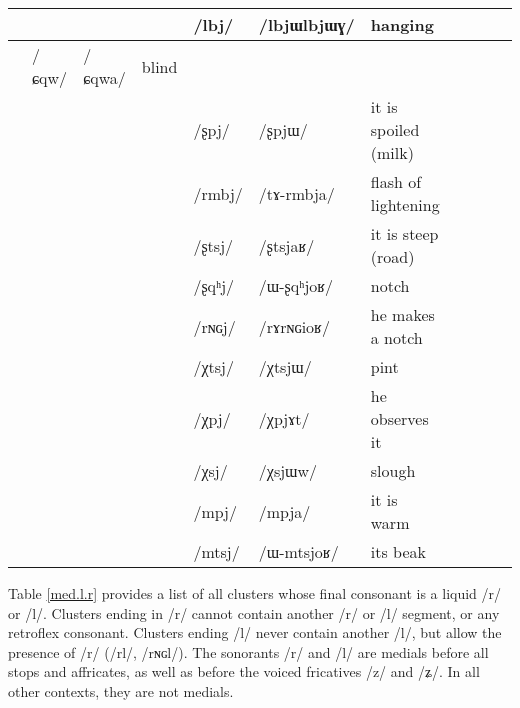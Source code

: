 \documentclass[oldfontcommands,oneside,a4paper,11pt]{article}
\newcommand{\ipa}[1]{/#1/} %
\newcommand{\trois}[1]{/#1/}
\newcommand{\tib}[1]{\cellcolor{lightgray}\textbf{#1}}
\newcommand{\idph}[1]{\cellcolor{gray}\textbf{#1}}
\begin{document}
\begin{table}
{\begin{tabular}{l|lll|lll|lll|l}
 		& 		&		&		&\trois{lbj} \idph{}		&\ipa{lbjɯlbjɯɣ} 		&hanging\\
\midrule												
		&\trois{ɕqw}		&\ipa{ɕqwa} 		&blind\\						
 		& 		&		&		&\trois{ʂpj} 		&\ipa{ʂpjɯ} 		&it is spoiled (milk)\\
 		& 		&		&		&\trois{rmbj} 		&\ipa{tɤ-rmbja} 		&flash of lightening\\
 		& 		&		&		&\trois{ʂtsj} 		&\ipa{ʂtsjaʁ} 		&it is steep (road)\\
 		& 		&		&		&\trois{ʂqʰj} 		&\ipa{ɯ-ʂqʰjoʁ} 		&notch\\
 		& 		&		&		&\trois{rɴɢj} 		&\ipa{rɤrɴɢioʁ} 		&he makes a notch\\
\midrule												
 		& 		&		&		&\trois{χtsj} 		&\ipa{χtsjɯ} 		&pint\\
 		& 		&		&		&\trois{χpj} \tib{}		&\ipa{χpjɤt} 		&he  observes it\\
 		& 		&		&		&\trois{χsj} 		&\ipa{χsjɯw} 		&slough \\
\midrule												
 		& 		&		&		&\trois{mpj} 		&\ipa{mpja} 		&it is warm\\
 		& 		&		&		&\trois{mtsj} 		&\ipa{ɯ-mtsjoʁ} 		&its beak\\
\end{tabular}}
\end{table}
 
  
  Table  \ref{med.l.r} provides a  list of all clusters whose final consonant is a liquid  \ipa{r} or \ipa{l}. Clusters ending in \ipa{r} cannot contain another \ipa{r} or \ipa{l} segment, or any retroflex consonant. Clusters ending \ipa{l} never contain another \ipa{l}, but allow the presence of \ipa{r} (\ipa{rl}, \ipa{rɴɢl}). The sonorants \ipa{r} and \ipa{l} are medials before all stops and affricates, as well as before the voiced fricatives \ipa{z} and \ipa{ʑ}. In all other contexts, they are not medials.
  
\end{document}
